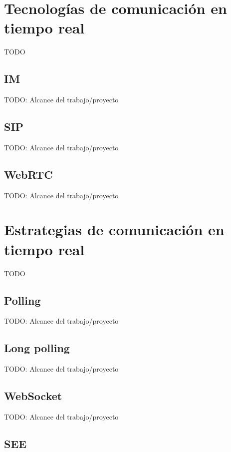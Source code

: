 \section{Tecnologías de comunicación en tiempo real}

TODO

\subsection{IM}

TODO: Alcance del trabajo/proyecto

\subsection{SIP}

TODO: Alcance del trabajo/proyecto

\subsection{WebRTC}

TODO: Alcance del trabajo/proyecto

\section{Estrategias de comunicación en tiempo real}

TODO

\subsection{Polling}

TODO: Alcance del trabajo/proyecto

\subsection{Long polling}

TODO: Alcance del trabajo/proyecto

\subsection{WebSocket}

TODO: Alcance del trabajo/proyecto

\subsection{SEE}

